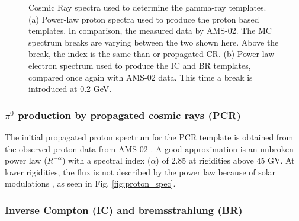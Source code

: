 \begin{figure}[h]
\begin{minipage}[h]{0.45\textwidth}
	  \subcaption{}
	  \label{fig:electron_spec}
  \end{minipage}
  \caption[Initial CR spectra.]{Cosmic Ray spectra used to determine the gamma-ray templates. (a) Power-law proton spectra used to produce the proton based templates. In comparison, the measured data by AMS-02. The MC spectrum breaks are varying between the two shown here. Above the break, the index is the same than or propagated CR. (b) Power-law electron spectrum used to produce the IC and BR templates, compared once again with AMS-02 data. This time a break is introduced at 0.2 GeV.}
  \label{fig:cosmic_ray_spec}
\end{figure}


\subsubsection{$\pi^0$ production by propagated cosmic rays (PCR)}

The initial propagated proton spectrum for the PCR template is obtained from the observed proton data from AMS-02 \cite{Aguilar15}. A good approximation is an unbroken power law ($R^{-\alpha}$) with a spectral index ($\alpha$) of 2.85 at rigidities above 45 GV. At lower rigidities, the flux is not described by the power law because of solar modulations \cite{Gleeson68}, as seen in Fig. \ref{fig:proton_spec}. %



\subsubsection{Inverse Compton (IC) and bremsstrahlung (BR)}

